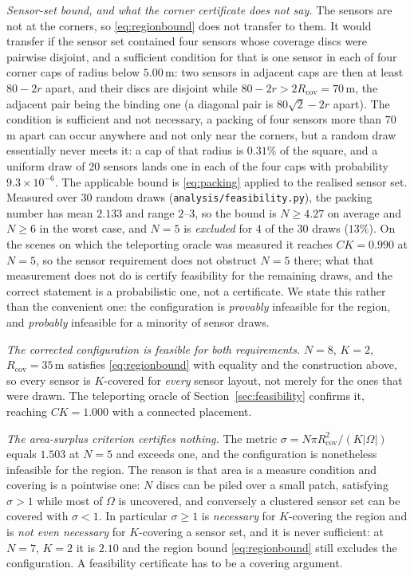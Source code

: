 \documentclass[conference]{IEEEtran}
\newcommand{\tokCapP}{9.3\times 10^{-6}}
\newcommand{\tokCapPct}{0.31}
\newcommand{\tokCapR}{5.00}
\newcommand{\tokCapTwoR}{70}
\newcommand{\tokInfOracle}{0.990}
\newcommand{\tokPackExcluded}{4}
\newcommand{\tokPackExclPct}{13}
\newcommand{\tokPackMax}{3}
\newcommand{\tokPackMean}{2.133}
\newcommand{\tokPackMin}{2}
\newcommand{\tokPackNMax}{6}
\newcommand{\tokPackNMean}{4.27}
\newcommand{\tokPackSeeds}{30}
\begin{document}
\emph{Sensor-set bound, and what the corner certificate does not say.} The
sensors are not at the corners, so \eqref{eq:regionbound} does not transfer
to them.  It would transfer if the sensor set contained four sensors whose
coverage discs were pairwise disjoint, and a sufficient condition for that
is one sensor in each of four corner caps of radius below
$\tokCapR\,\mathrm{m}$: two sensors in adjacent caps are then at least
$80-2r$ apart, and their discs are disjoint while
$80-2r>2R_{\mathrm{cov}}=\tokCapTwoR\,\mathrm{m}$, the adjacent pair
being the binding one (a diagonal pair is $80\sqrt2-2r$ apart).  The
condition is sufficient and not necessary, a packing of four sensors
more than $\tokCapTwoR$ m apart can occur anywhere and not only near the
corners, but a random draw essentially never meets it: a cap of that
radius is $\tokCapPct\%$ of the square, and a uniform draw of $20$ sensors
lands one in each of the four caps with probability $\tokCapP$.  The
applicable bound is \eqref{eq:packing} applied to the realised sensor set.
Measured over $\tokPackSeeds$ random draws
(\texttt{analysis/feasibility.py}), the packing number has mean
$\tokPackMean$ and range $\tokPackMin$--$\tokPackMax$, so the bound is
$N\ge \tokPackNMean$ on average and $N\ge \tokPackNMax$ in the worst
case, and $N=5$ is \emph{excluded} for $\tokPackExcluded$ of the
$\tokPackSeeds$ draws ($\tokPackExclPct\%$).  On the scenes on which the
teleporting oracle was measured it reaches $CK=\tokInfOracle$ at $N=5$, so
the sensor requirement does not obstruct $N=5$ there; what that
measurement does not do is certify feasibility for the remaining draws,
and the correct statement is a probabilistic one, not a certificate.  We state this rather than the
convenient one: the configuration is \emph{provably} infeasible for the
region, and
\emph{probably} infeasible for a minority of sensor draws.

\emph{The corrected configuration is feasible for both requirements.}
$N=8$, $K=2$, $R_{\mathrm{cov}}=35$\,m satisfies \eqref{eq:regionbound}
with equality and the construction above, so every sensor is $K$-covered
for \emph{every} sensor layout, not merely for the ones that were drawn.
The teleporting oracle of Section~\ref{sec:feasibility} confirms it,
reaching $CK=1.000$ with a connected placement.

\emph{The area-surplus criterion certifies nothing.} The metric
$\sigma=N\pi R_{\mathrm{cov}}^{2}/(K|\Omega|)$ equals $1.503$ at $N=5$ and
exceeds one, and the configuration is nonetheless infeasible for the region.
The reason is that area is a measure condition and covering is a pointwise
one: $N$ discs can be piled over a small patch, satisfying $\sigma>1$ while
most of $\Omega$ is uncovered, and conversely a clustered sensor set can be
covered with $\sigma<1$.  In particular $\sigma\ge1$ is \emph{necessary}
for $K$-covering the region and is \emph{not even necessary} for
$K$-covering a sensor set, and it is never sufficient: at $N=7$, $K=2$ it is
$2.10$ and the region bound \eqref{eq:regionbound} still excludes the
configuration.  A feasibility certificate has to be a covering argument.
\end{document}
